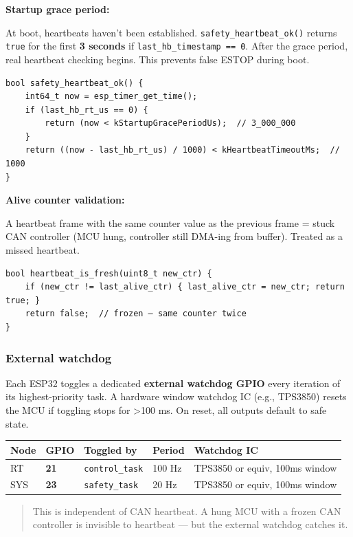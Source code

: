 \textbf{Startup grace period:}

At boot, heartbeats haven't been established. \texttt{safety\_heartbeat\_ok()}
returns \texttt{true} for the first \textbf{3 seconds} if
\texttt{last\_hb\_timestamp\ ==\ 0}. After the grace period, real heartbeat
checking begins. This prevents false ESTOP during boot.

\begin{verbatim}
bool safety_heartbeat_ok() {
    int64_t now = esp_timer_get_time();
    if (last_hb_rt_us == 0) {
        return (now < kStartupGracePeriodUs);  // 3_000_000
    }
    return ((now - last_hb_rt_us) / 1000) < kHeartbeatTimeoutMs;  // 1000
}
\end{verbatim}

\textbf{Alive counter validation:}

A heartbeat frame with the same counter value as the previous frame = stuck CAN
controller (MCU hung, controller still DMA-ing from buffer). Treated as a missed
heartbeat.

\begin{verbatim}
bool heartbeat_is_fresh(uint8_t new_ctr) {
    if (new_ctr != last_alive_ctr) { last_alive_ctr = new_ctr; return true; }
    return false;  // frozen — same counter twice
}
\end{verbatim}

\subsubsection{External watchdog}\label{external-watchdog}

Each ESP32 toggles a dedicated \textbf{external watchdog GPIO} every iteration
of its highest-priority task. A hardware window watchdog IC (e.g., TPS3850)
resets the MCU if toggling stops for \textgreater100 ms. On reset, all outputs
default to safe state.

\begin{longtable}[]{@{}lllll@{}}
\toprule\noalign{}
Node & GPIO & Toggled by & Period & Watchdog IC \\
\midrule\noalign{}
\endhead
\bottomrule\noalign{}
\endlastfoot
RT & \textbf{21} & \texttt{control\_task} & 100 Hz & TPS3850 or equiv, 100ms
window \\
SYS & \textbf{23} & \texttt{safety\_task} & 20 Hz & TPS3850 or equiv, 100ms
window \\
\end{longtable}

\begin{quote}
This is independent of CAN heartbeat. A hung MCU with a frozen CAN controller is
invisible to heartbeat --- but the external watchdog catches it.
\end{quote}

